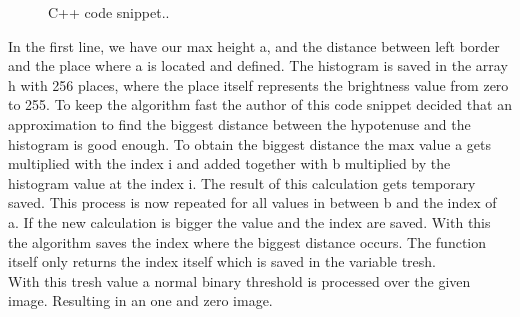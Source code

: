 \lstset{style=mystyle}
\begin{figure}[ht]
	\centering
	
	\caption{C++ code snippet.\cite{cv_code}.}
	\label{theory:code}
\end{figure}
In the  first line, we have our max height a, and the distance between left border and the place where a is located and defined. The histogram is saved in the array h with 256 places, where the place itself represents the brightness value from zero to 255.
To keep the algorithm fast the author of this code snippet decided that an approximation to find the biggest distance between the hypotenuse and the histogram is good enough. To obtain the biggest distance the max value a gets multiplied with the index i and added together with b multiplied by the histogram value at the index i. The result of this calculation gets temporary saved. This process is now repeated for all values in between b and the index of a. If the new calculation is bigger the value and the index are saved. With this the algorithm saves the index where the biggest distance occurs. The function itself only returns the index itself which is saved in the variable tresh. \\
With this tresh value a normal binary threshold is processed over the given image. Resulting in an one and zero image.   
\newpage
